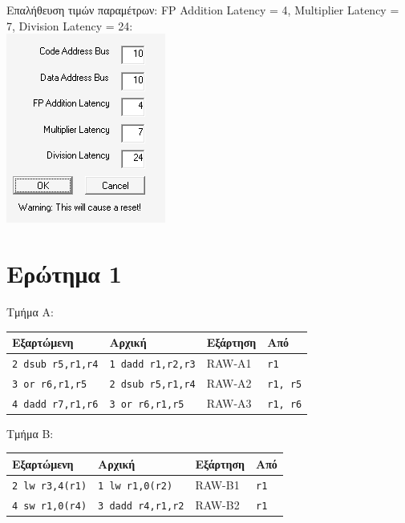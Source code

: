 \documentclass[12pt]{article}
\begin{document}
Επαλήθευση τιμών παραμέτρων: FP Addition Latency = 4, Multiplier Latency = 7,
Division Latency = 24: \\

\includegraphics{res/latency.png}

\section{Ερώτημα 1}

Τμήμα Α:

\begin{center}
\begin{tabular}{|l|l|l|l|}
	\hline
	\textbf{Εξαρτώμενη} & \textbf{Αρχική} & \textbf{Εξάρτηση} & \textbf{Από} \\
	\hline
	\lstinline|2 dsub r5,r1,r4| & \lstinline|1 dadd r1,r2,r3| & RAW-A1 & \lstinline|r1| \\
	\hline
	\lstinline|3 or r6,r1,r5| & \lstinline|2 dsub r5,r1,r4| & RAW-A2 & \lstinline|r1, r5| \\
	\hline
	\lstinline|4 dadd r7,r1,r6| & \lstinline|3 or r6,r1,r5| & RAW-A3 & \lstinline|r1, r6| \\
	\hline
\end{tabular}
\end{center}

Τμήμα B:

\begin{center}
\begin{tabular}{|l|l|l|l|}
	\hline
	\textbf{Εξαρτώμενη} & \textbf{Αρχική} & \textbf{Εξάρτηση} & \textbf{Από} \\
	\hline
	\lstinline|2 lw r3,4(r1)| & \lstinline|1 lw r1,0(r2)| & RAW-B1 & \lstinline|r1| \\
	\hline
	\lstinline|4 sw r1,0(r4)| & \lstinline|3 dadd r4,r1,r2| & RAW-B2 & \lstinline|r1| \\
	\hline
\end{tabular}
\end{center}
\end{document}
